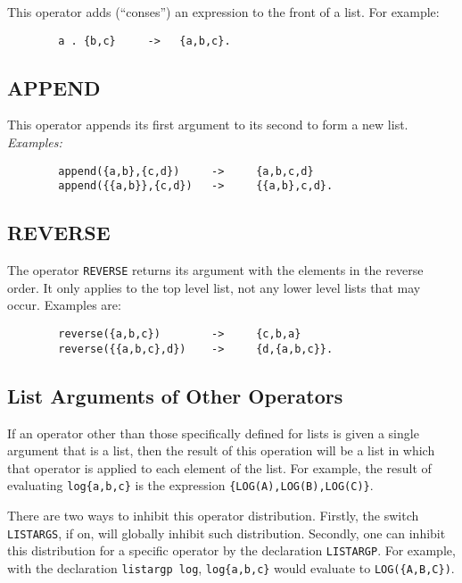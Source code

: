 This operator adds (``conses'') an expression to the
front of a list.  For example:
\begin{verbatim}
        a . {b,c}     ->   {a,b,c}.
\end{verbatim}

\subsection{APPEND}

This operator appends its first argument to its second to
form a new list.
{\it Examples:}
\begin{verbatim}
        append({a,b},{c,d})     ->     {a,b,c,d}
        append({{a,b}},{c,d})   ->     {{a,b},c,d}.
\end{verbatim}

\subsection{REVERSE}

The operator {\tt REVERSE} returns its argument with the
elements in the reverse order.  It only applies to the top level list, not
any lower level lists that may occur.  Examples are:
\begin{verbatim}
        reverse({a,b,c})        ->     {c,b,a}
        reverse({{a,b,c},d})    ->     {d,{a,b,c}}.
\end{verbatim}

\subsection{List Arguments of Other Operators}

If an operator other than those specifically defined for lists is given a
single argument that is a list, then the result of this operation will be
a list in which that operator is applied to each element of the list.  For
example, the result of evaluating {\tt log\{a,b,c\}} is the expression
{\tt \{LOG(A),LOG(B),LOG(C)\}}.

There are two ways to inhibit this operator distribution.  Firstly, the
switch {\tt LISTARGS}, if on, will globally inhibit
such distribution.  Secondly, one can inhibit this distribution for a
specific operator by the declaration {\tt LISTARGP}. For
example, with the declaration {\tt listargp log}, {\tt log\{a,b,c\}} would
evaluate to {\tt LOG(\{A,B,C\})}.

